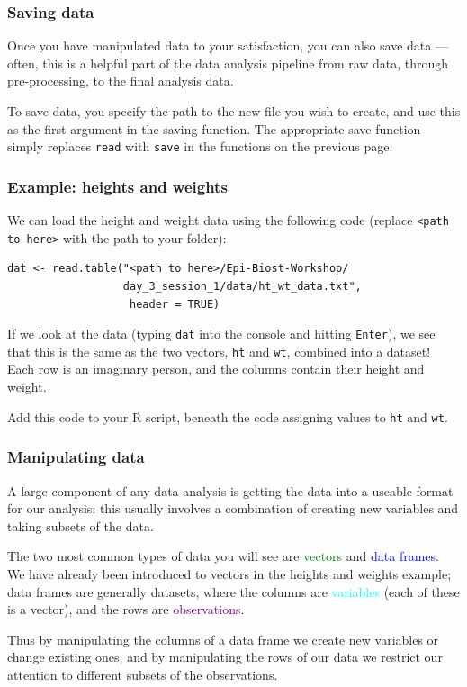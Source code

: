\documentclass[11pt]{beamer}
\newcommand{\myframe}[1]{\begin{frame} \frametitle{#1}}
\begin{document}
\myframe{Saving data}
Once you have manipulated data to your satisfaction, you can also save data --- often, this is a helpful part of the data analysis pipeline from raw data, through pre-processing, to the final analysis data.

To save data, you specify the path to the new file you wish to create, and use this as the first argument in the saving function. The appropriate save function simply replaces \texttt{read} with \texttt{save} in the functions on the previous page.
\end{frame}

\begin{frame}[fragile]
\frametitle{Example: heights and weights}

We can load the height and weight data using the following code (replace \texttt{<path to here>} with the path to your folder):

{\small
\begin{verbatim}
dat <- read.table("<path to here>/Epi-Biost-Workshop/
                  day_3_session_1/data/ht_wt_data.txt",
                   header = TRUE)
\end{verbatim}
}

If we look at the data (typing \texttt{dat} into the console and hitting \texttt{Enter}), we see that this is the same as the two vectors, \texttt{ht} and \texttt{wt}, combined into a dataset! Each row is an imaginary person, and the columns contain their height and weight.

Add this code to your R script, beneath the code assigning values to \texttt{ht} and \texttt{wt}.
\end{frame}

\myframe{Manipulating data}
A large component of any data analysis is getting the data into a useable format for our analysis: this usually involves a combination of creating new variables and taking subsets of the data.

The two most common types of data you will see are \textcolor{green}{vectors} and \textcolor{blue}{data frames}. We have already been introduced to vectors in the heights and weights example; data frames are generally datasets, where the columns are \textcolor{cyan}{variables} (each of these is a vector), and the rows are \textcolor{purple}{observations}.

Thus by manipulating the columns of a data frame we create new variables or change existing ones; and by manipulating the rows of our data we restrict our attention to different subsets of the observations.
\end{frame}
\end{document}
